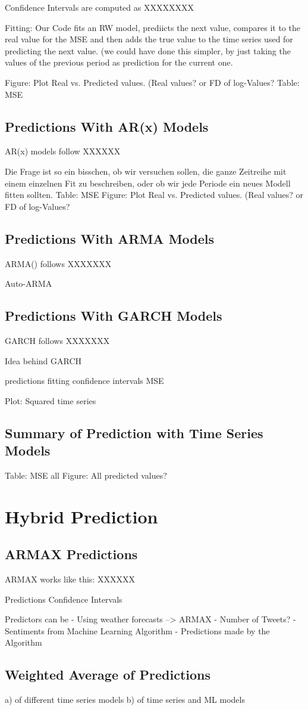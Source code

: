 Confidence Intervals are computed as
XXXXXXXX

Fitting: 
Our Code fits an RW model, prediicts the next value, compares it to the real value for the MSE and then adds the true value to the time series used for predicting the next value. (we could have done this simpler, by just taking the values of the previous period as prediction for the current one. 

Figure: Plot Real vs. Predicted values. (Real values? or FD of log-Values?
Table: MSE

\subsection{Predictions With AR(x) Models}
AR(x) models follow
XXXXXX

Die Frage ist so ein bisschen, ob wir versuchen sollen, die ganze Zeitreihe mit einem einzelnen Fit zu beschreiben, oder ob wir jede Periode ein neues Modell fitten sollten. 
Table: MSE
Figure: Plot Real vs. Predicted values. (Real values? or FD of log-Values?

\subsection{Predictions With ARMA Models}
ARMA() follows
XXXXXXX


Auto-ARMA


\subsection{Predictions With GARCH Models}
GARCH follows 
XXXXXXX

Idea behind GARCH

predictions
fitting
confidence intervals
MSE

Plot: Squared time series



\subsection{Summary of Prediction with Time Series Models}
Table: MSE all
Figure: All predicted values?


\section{Hybrid Prediction}

\subsection{ARMAX Predictions}
ARMAX works like this: 
XXXXXX

Predictions
Confidence Intervals


Predictors can be 
- Using weather forecasts --> ARMAX
- Number of Tweets?
- Sentiments from Machine Learning Algorithm
- Predictions made by the Algorithm



\subsection{Weighted Average of Predictions}
a) of different time series models
b) of time series and ML models